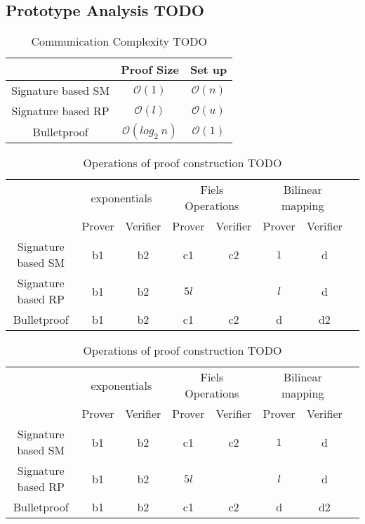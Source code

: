 \subsection{Prototype Analysis TODO}
\begin{table}
\label{tab:compare}
\caption{Communication Complexity TODO}
\begin{tabular}{| *{3}{c|}}
			 \hline
    									&Proof Size 		&		Set up  \\ \hline		
  Signature based SM  	&   $\mathcal{O} (1) $ 					 &			 $\mathcal{O} (n)$				\\ \hline 
  Signature based RP  	&   $\mathcal{O} (l)$   	&	$\mathcal{O} (u)$ 
  	\\ \hline
  Bulletproof   				&   $ \mathcal{O} (  log_2\: n ) $  & $\mathcal{O} (1)$ 	\\
  \hline			
\end{tabular}
 \end{table}
	

\begin{table}
\label{tab:compare}
\caption{Operations of proof construction TODO}
\begin{tabular}{| *{8}{c|}}
			 \hline
    										&   \multicolumn{2}{c|}{exponentials} 	& \multicolumn{2}{c|}{Fiels Operations}    & \multicolumn{2}{c|}{Bilinear mapping }        	\\
&  Prover & Verifier & Prover & Verifier&	Prover & Verifier 						 	\\ \hline
  Signature based SM  			&   b1  &   b2  											&   c1  &   c2    & $1$							 &d						\\ \hline 
  Signature based RP  	&   b1  &   b2 							&   $5l$ &     	 & $l$	& d	 										\\ \hline
  Bulletproof   						& b1  &   b2 												&   c1 &   c2     & d					&d2								\\ \hline	
\end{tabular}
 \end{table}
	
	\begin{table}
\label{tab:compare}
\caption{Operations of proof construction TODO}
\begin{tabular}{| *{8}{c|}}
			 \hline
    										&   \multicolumn{2}{c|}{exponentials} 	& \multicolumn{2}{c|}{Fiels Operations}    & \multicolumn{2}{c|}{Bilinear mapping }        	\\
&  Prover & Verifier & Prover & Verifier&	Prover & Verifier 						 	\\ \hline
  Signature based SM  			&   b1  &   b2  											&   c1  &   c2    & $1$							 &d						\\ \hline 
  Signature based RP  	&   b1  &   b2 							&   $5l$ &     	 & $l$	& d	 										\\ \hline
  Bulletproof   						& b1  &   b2 												&   c1 &   c2     & d					&d2								\\ \hline	
\end{tabular}
 \end{table}
	

